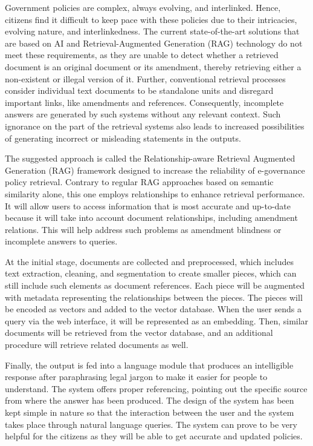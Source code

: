 \documentclass[conference]{IEEEtran}
\begin{document}
Government policies are complex, always evolving, and interlinked. Hence, citizens find it difficult to keep pace with these policies due to their intricacies, evolving nature, and interlinkedness. The current state-of-the-art solutions that are based on AI and Retrieval-Augmented Generation (RAG) technology do not meet these requirements, as they are unable to detect whether a retrieved document is an original document or its amendment, thereby retrieving either a non-existent or illegal version of it. Further, conventional retrieval processes consider individual text documents to be standalone units and disregard important links, like amendments and references. Consequently, incomplete answers are generated by such systems without any relevant context. Such ignorance on the part of the retrieval systems also leads to increased possibilities of generating incorrect or misleading statements in the outputs.

The suggested approach is called the Relationship-aware Retrieval Augmented Generation (RAG) framework designed to increase the reliability of e-governance policy retrieval. Contrary to regular RAG approaches based on semantic similarity alone, this one employs relationships to enhance retrieval performance. It will allow users to access information that is most accurate and up-to-date because it will take into account document relationships, including amendment relations. This will help address such problems as amendment blindness or incomplete answers to queries.

At the initial stage, documents are collected and preprocessed, which includes text extraction, cleaning, and segmentation to create smaller pieces, which can still include such elements as document references. Each piece will be augmented with metadata representing the relationships between the pieces. The pieces will be encoded as vectors and added to the vector database. When the user sends a query via the web interface, it will be represented as an embedding. Then, similar documents will be retrieved from the vector database, and an additional procedure will retrieve related documents as well.

Finally, the output is fed into a language module that produces an intelligible response after paraphrasing legal jargon to make it easier for people to understand. The system offers proper referencing, pointing out the specific source from where the answer has been produced. The design of the system has been kept simple in nature so that the interaction between the user and the system takes place through natural language queries. The system can prove to be very helpful for the citizens as they will be able to get accurate and updated policies.
\end{document}
